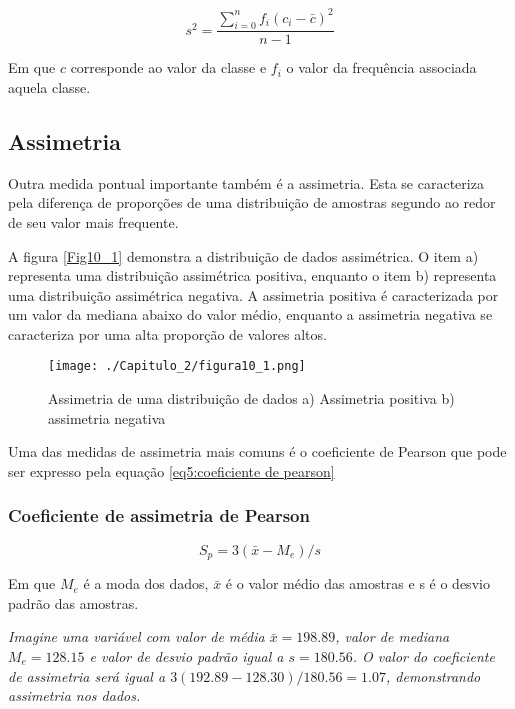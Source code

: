 \begin{equation}\label{eq5:variancia}
s^2 = \frac{\sum_{i = 0}^{n} f_{i}\left( c_i - \bar{c} \right)^2}{n-1}
\end{equation}

Em que $c$ corresponde ao valor da classe e $f_{i}$ o valor da frequência associada aquela classe.



\subsection{Assimetria}

Outra medida pontual importante também é a assimetria. Esta se caracteriza pela diferença de proporções de uma distribuição de amostras segundo ao redor de seu valor mais frequente. 

A figura \eqref{Fig10_1} demonstra a distribuição de dados assimétrica. O item a) representa uma distribuição assimétrica positiva, enquanto o item b) representa uma distribuição assimétrica negativa. A assimetria positiva é caracterizada por um valor da mediana abaixo do valor médio, enquanto a assimetria negativa se caracteriza por uma alta proporção de valores altos. 


\begin{figure}[H]
\centering
\texttt{[image: ./Capitulo\_2/figura10\_1.png]}	
\caption{Assimetria de uma distribuição de dados a) Assimetria positiva b) assimetria negativa }
\label{Fig10_1}
\end{figure}

Uma das medidas de assimetria mais comuns é o coeficiente de Pearson que pode ser expresso pela equação \eqref{eq5:coeficiente de pearson}

\subsubsection{Coeficiente de assimetria de Pearson}

\begin{equation}\label{eq5:coeficiente de pearson}
S_{p}= 3\left( \bar{x} - M_e\right)/s
\end{equation}

Em que $M_e$ é a moda dos dados, $\bar{x}$ é o valor médio das amostras e s é o desvio padrão das amostras. 

\begin{proposition}
\textit{Imagine uma variável com valor de média $\bar{x} = 198.89$, valor de mediana $M_e = 128.15$ e valor de desvio padrão igual a $s = 180.56$. O valor do coeficiente de assimetria será igual a $3(192.89 - 128.30)/180.56 = 1.07$, demonstrando assimetria nos dados.}
\end{proposition}

